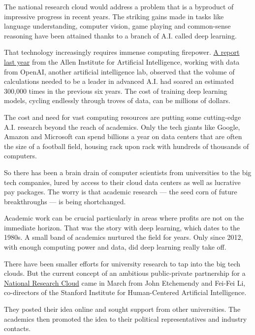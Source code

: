 The national research cloud would address a problem that is a byproduct
of impressive progress in recent years. The striking gains made in tasks
like language understanding, computer vision, game playing and
common-sense reasoning have been attained thanks to a branch of A.I.
called deep learning.

That technology increasingly requires immense computing firepower.
\href{https://arxiv.org/pdf/1907.10597.pdf}{A report last year} from the
Allen Institute for Artificial Intelligence, working with data from
OpenAI, another artificial intelligence lab, observed that the volume of
calculations needed to be a leader in advanced A.I. had soared an
estimated 300,000 times in the previous six years. The cost of training
deep learning models, cycling endlessly through troves of data, can be
millions of dollars.

The cost and need for vast computing resources are putting some
cutting-edge A.I. research beyond the reach of academics. Only the tech
giants like Google, Amazon and Microsoft can spend billions a year on
data centers that are often the size of a football field, housing rack
upon rack with hundreds of thousands of computers.

So there has been a brain drain of computer scientists from universities
to the big tech companies, lured by access to their cloud data centers
as well as lucrative pay packages. The worry is that academic research
--- the seed corn of future breakthroughs --- is being shortchanged.

Academic work can be crucial particularly in areas where profits are not
on the immediate horizon. That was the story with deep learning, which
dates to the 1980s. A small band of academics nurtured the field for
years. Only since 2012, with enough computing power and data, did deep
learning really take off.

There have been smaller efforts for university research to tap into the
big tech clouds. But the current concept of an ambitious public-private
partnership for a
\href{https://hai.stanford.edu/blog/national-research-cloud-ensuring-continuation-american-innovation}{National
Research Cloud} came in March from John Etchemendy and Fei-Fei Li,
co-directors of the Stanford Institute for Human-Centered Artificial
Intelligence.

They posted their idea online and sought support from other
universities. The academics then promoted the idea to their political
representatives and industry contacts.


